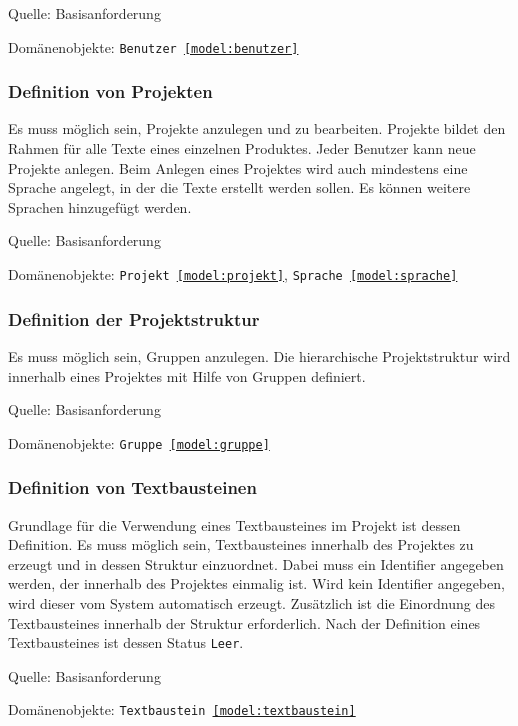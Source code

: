 \textsf{Quelle:} Basisanforderung

\textsf{Domänenobjekte:} \texttt{Benutzer \ref{model:benutzer}}

\subsubsection{Definition von Projekten}\label{anforderung:definition-projekt}

Es muss möglich sein, Projekte anzulegen und zu bearbeiten. Projekte bildet den Rahmen für alle Texte eines einzelnen Produktes. Jeder Benutzer kann neue Projekte anlegen. Beim Anlegen eines Projektes wird auch mindestens eine Sprache angelegt, in der die Texte erstellt werden sollen. Es können weitere Sprachen hinzugefügt werden.

\textsf{Quelle:} Basisanforderung

\textsf{Domänenobjekte:} \texttt{Projekt \ref{model:projekt}},  \texttt{Sprache \ref{model:sprache}}

\subsubsection{Definition der Projektstruktur}

Es muss möglich sein, Gruppen anzulegen. Die hierarchische Projektstruktur wird innerhalb eines Projektes mit Hilfe von Gruppen definiert. 

\textsf{Quelle:} Basisanforderung

\textsf{Domänenobjekte:} \texttt{Gruppe \ref{model:gruppe}}

\subsubsection{Definition von Textbausteinen}

Grundlage für die Verwendung eines Textbausteines im Projekt ist dessen Definition. Es muss möglich sein, Textbausteines innerhalb des Projektes zu erzeugt und in dessen Struktur einzuordnet. Dabei muss ein Identifier angegeben werden, der innerhalb des Projektes einmalig ist. Wird kein Identifier angegeben, wird dieser vom System automatisch erzeugt. Zusätzlich ist die Einordnung des Textbausteines innerhalb der Struktur erforderlich. Nach der Definition eines Textbausteines ist dessen Status \texttt{Leer}.

\textsf{Quelle:} Basisanforderung

\textsf{Domänenobjekte:} \texttt{Textbaustein \ref{model:textbaustein}}

